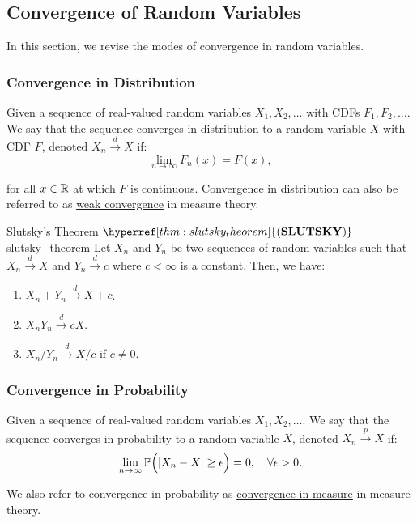 \subsection{Convergence of Random Variables}
\newcommand{\SLUTSKY}{\hyperref[thm:slutsky_theorem]{(\mathrm{{\bf SLUTSKY}})}}

In this section, we revise the modes of convergence in random variables. 
\subsubsection{Convergence in Distribution}
\begin{definition}
    Given a sequence of real-valued random variables $X_1, X_2, \dots$ with CDFs $F_1, F_2, \dots$. We say that the sequence converges in distribution to a random variable $X$ with CDF $F$, denoted $X_n\xrightarrow{d}X$ if:
    \begin{equation}
        \lim_{n\to\infty}F_n(x) = F(x),
    \end{equation}

    \noindent for all $x\in\mathbb{R}$ at which $F$ is continuous. Convergence in distribution can also be referred to as \underline{weak convergence} in measure theory.
\end{definition}

\begin{theorem}{Slutsky's Theorem $\SLUTSKY$}{slutsky_theorem}
    Let $X_n$ and $Y_n$ be two sequences of random variables such that $X_n\xrightarrow{d}X$ and $Y_n\xrightarrow{d} c$ where $c<\infty$ is a constant. Then, we have:
    \begin{enumerate}
        \item $X_n + Y_n \xrightarrow{d} X + c$.
        \item $X_nY_n \xrightarrow{d} cX$.
        \item $X_n/Y_n \xrightarrow{d} X/c$ if $c \ne 0$. 
    \end{enumerate} 
\end{theorem} 

\begin{proof*}
\end{proof*} 

\subsubsection{Convergence in Probability}
\begin{definition}
    Given a sequence of real-valued random variables $X_1, X_2, \dots$. We say that the sequence converges in probability to a random variable $X$, denoted $X_n\xrightarrow{p}X$ if:
    \begin{equation}
        \lim_{n\to\infty} \mathbb{P}\Big( |X_n - X| \ge \epsilon \Big) = 0, \quad \forall \epsilon > 0.
    \end{equation}

    \noindent We also refer to convergence in probability as \underline{convergence in measure} in measure theory.
\end{definition}

